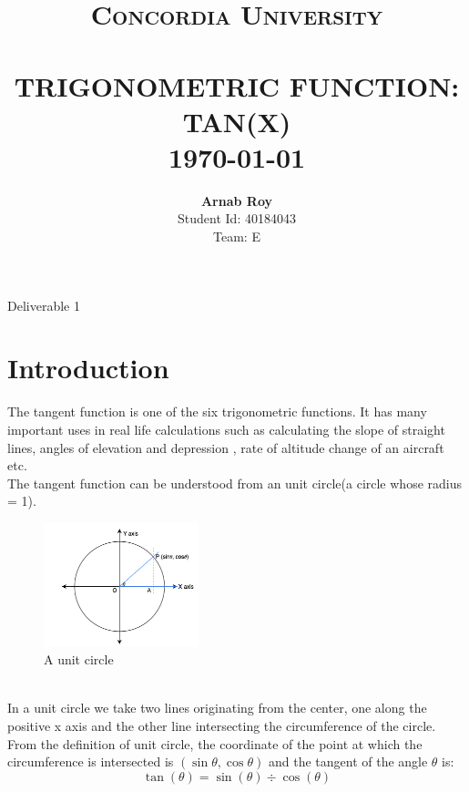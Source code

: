 \documentclass[paper=a4, fontsize=11pt,twoside]{scrartcl}	%
\title{	\normalsize \textsc{Concordia University} 	%
		 	\\[2.0cm]								%
			\HRule{0.5pt} \\						%
			\LARGE \textbf{\uppercase{Trigonometric function: \MakeLowercase{tan(x)}}}	%
			\HRule{2pt} \\ [0.5cm]		%
			\normalsize \today			%
		}
\author{
		\textbf{\LARGE Arnab Roy} \\[10pt]
		{\Large Student Id: 40184043} \\[5pt]
		{\Large Team: E} \\
}
\makeatletter
\def\printtitle{%
    {\centering \@title\par}}
\def\printauthor{%
    {\centering \large \@author}}
\makeatother
\begin{document}
\thispagestyle{empty}		%

\printtitle					%
\begin{center}
    \huge{Deliverable 1}
\end{center}
\vspace{35mm}
\printauthor				%
\newpage
\tableofcontents
\newpage

\setcounter{page}{1}		%
\section{Introduction}
    The tangent function is one of the six trigonometric functions. It has many important uses in real life calculations such as calculating the slope of straight lines, angles of elevation and depression \cite{tanexamplewebsite1}, rate of altitude change of an aircraft \cite{tanexamplewebsite2} etc. \\
    The tangent function can be understood from an unit circle(a circle whose radius = 1).
    \begin{figure} [!h]
        \centering
        \includegraphics[width=0.4\textwidth]{Unit-circle.png}
        \caption{A unit circle}
        \label{fig:unit_circle}
    \end{figure} \\
    In a unit circle we take two lines originating from the center, one along the positive x axis and the other line intersecting the circumference of the circle. From the definition of unit circle, the coordinate of the point at which the circumference is intersected is $(\sin\theta, \cos\theta)$ \cite{unitcirclewebsite} and the tangent of the angle $\theta$ is:
    \begin{equation}
        \tan(\theta) = \sin(\theta) \div \cos(\theta) \label{tan_formula_1}
    \end{equation}
\end{document}

